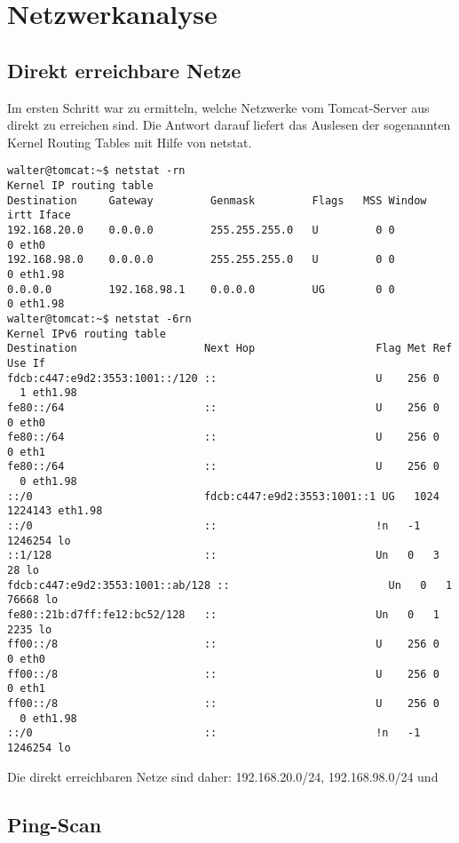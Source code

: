\section{Netzwerkanalyse}

\subsection{Direkt erreichbare Netze}

Im ersten Schritt war zu ermitteln, welche Netzwerke vom Tomcat-Server aus direkt zu erreichen sind. Die Antwort darauf liefert das Auslesen der sogenannten Kernel Routing Tables mit Hilfe von netstat.

\begin{lstlisting}
walter@tomcat:~$ netstat -rn
Kernel IP routing table
Destination     Gateway         Genmask         Flags   MSS Window  irtt Iface
192.168.20.0    0.0.0.0         255.255.255.0   U         0 0          0 eth0
192.168.98.0    0.0.0.0         255.255.255.0   U         0 0          0 eth1.98
0.0.0.0         192.168.98.1    0.0.0.0         UG        0 0          0 eth1.98
walter@tomcat:~$ netstat -6rn
Kernel IPv6 routing table
Destination                    Next Hop                   Flag Met Ref Use If
fdcb:c447:e9d2:3553:1001::/120 ::                         U    256 0
  1 eth1.98
fe80::/64                      ::                         U    256 0     0 eth0
fe80::/64                      ::                         U    256 0     0 eth1
fe80::/64                      ::                         U    256 0
  0 eth1.98
::/0                           fdcb:c447:e9d2:3553:1001::1 UG   1024
1224143 eth1.98
::/0                           ::                         !n   -1  1246254 lo
::1/128                        ::                         Un   0   3    28 lo
fdcb:c447:e9d2:3553:1001::ab/128 ::                         Un   0   1 76668 lo
fe80::21b:d7ff:fe12:bc52/128   ::                         Un   0   1  2235 lo
ff00::/8                       ::                         U    256 0     0 eth0
ff00::/8                       ::                         U    256 0     0 eth1
ff00::/8                       ::                         U    256 0
  0 eth1.98
::/0                           ::                         !n   -1  1246254 lo
\end{lstlisting}

Die direkt erreichbaren Netze sind daher: 192.168.20.0/24, 192.168.98.0/24 und 

\subsection{Ping-Scan}

